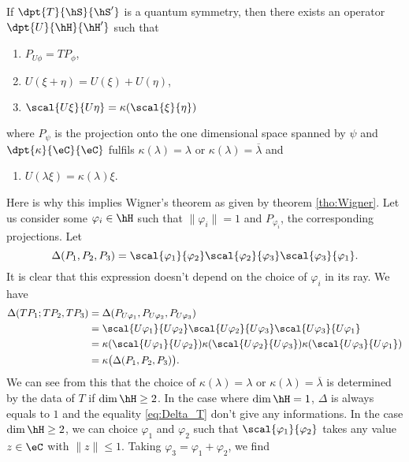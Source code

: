 \begin{theorem}
If $\dpt{T}{\hS}{\hS'}$ is a quantum symmetry, then there exists an operator $\dpt{U}{\hH}{\hH'}$ such that

\begin{enumerate}
\item $P_{U\phi}=TP_{\phi}$,
\item $U(\xi+\eta)=U(\xi)+U(\eta)$,
\item $\scal{U\xi}{U\eta}=\kappa(\scal{\xi}{\eta})$ \label{item:cond_3}
\end{enumerate}
\setcounter{bidon}{\value{enumi}}
where $P_{\psi}$ is the projection onto the one dimensional space spanned by $\psi$ and $\dpt{\kappa}{\eC}{\eC}$ fulfils $\kappa(\lambda)=\lambda$ or $\kappa(\lambda)=\overline{\lambda}$ and 

\begin{enumerate}
\setcounter{enumi}{\value{bidon}}
\item $U(\lambda\xi)=\kappa(\lambda)\xi$.
\end{enumerate}
\label{tho:pre_Wigner}
\end{theorem}
Here is why this implies Wigner's theorem as given by theorem \ref{tho:Wigner}. Let us consider some $\varphi_i\in\hH$ such that $\|\varphi_i\|=1$ and $P_{\varphi_i}$, the corresponding projections. Let
\[
   \Delta(P_1,P_2,P_3)=\scal{\varphi_1}{\varphi_2}\scal{\varphi_2}{\varphi_3}\scal{\varphi_3}{\varphi_1}.
\]
It is clear that this expression doesn't depend on the choice of $\varphi_i$ in its ray. We have
\begin{equation}\label{eq:Delta_T}
\begin{split}
\Delta(TP_1;TP_2,TP_3)&=\Delta(P_{U\varphi_1},P_{U\varphi_2},P_{U\varphi_3})\\
                      &=\scal{U\varphi_1}{U\varphi_2}\scal{U\varphi_2}{U\varphi_3}\scal{U\varphi_3}{U\varphi_1}\\
		      &=\kappa(\scal{U\varphi_1}{U\varphi_2})\kappa(\scal{U\varphi_2}{U\varphi_3})\kappa(\scal{U\varphi_3}{U\varphi_1})\\
		      &=\kappa\big(\Delta(P_1,P_2,P_3)\big).
\end{split}
\end{equation}
We can see from this that the choice of $\kappa(\lambda)=\lambda$ or $\kappa(\lambda)=\overline{\lambda}$ is determined by the data of $T$ if $\dim\hH\geq 2$. In the case where $\dim\hH=1$, $\Delta$ is always equals to $1$ and the equality \eqref{eq:Delta_T} don't give any informations. In the case $\dim\hH\geq 2$, we can choice $\varphi_1$ and $\varphi_2$ such that $\scal{\varphi_1}{\varphi_2}$ takes any value $z\in\eC$ with $\|z\|\leq 1$. Taking $\varphi_3=\varphi_1+\varphi_2$, we find
